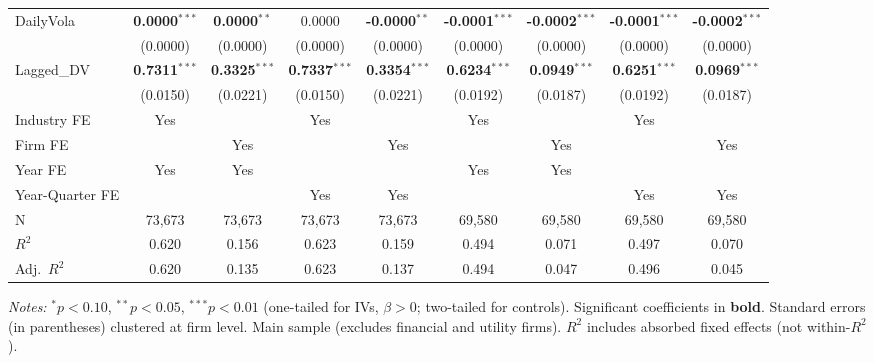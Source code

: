 \documentclass[11pt,a4paper]{article}
\begin{document}
\begin{table}[htbp]
\begin{tabular}{lcccccccc}
DailyVola & \textbf{0.0000}$^{***}$ & \textbf{0.0000}$^{**}$ & 0.0000 & \textbf{-0.0000}$^{**}$ & \textbf{-0.0001}$^{***}$ & \textbf{-0.0002}$^{***}$ & \textbf{-0.0001}$^{***}$ & \textbf{-0.0002}$^{***}$ \\
 & (0.0000) & (0.0000) & (0.0000) & (0.0000) & (0.0000) & (0.0000) & (0.0000) & (0.0000) \\
Lagged\_DV & \textbf{0.7311}$^{***}$ & \textbf{0.3325}$^{***}$ & \textbf{0.7337}$^{***}$ & \textbf{0.3354}$^{***}$ & \textbf{0.6234}$^{***}$ & \textbf{0.0949}$^{***}$ & \textbf{0.6251}$^{***}$ & \textbf{0.0969}$^{***}$ \\
 & (0.0150) & (0.0221) & (0.0150) & (0.0221) & (0.0192) & (0.0187) & (0.0192) & (0.0187) \\
\midrule
Industry FE & Yes &  & Yes &  & Yes &  & Yes &  \\
Firm FE &  & Yes &  & Yes &  & Yes &  & Yes \\
Year FE & Yes & Yes &  &  & Yes & Yes &  &  \\
Year-Quarter FE &  &  & Yes & Yes &  &  & Yes & Yes \\
\midrule
N & 73,673 & 73,673 & 73,673 & 73,673 & 69,580 & 69,580 & 69,580 & 69,580 \\
$R^2$ & 0.620 & 0.156 & 0.623 & 0.159 & 0.494 & 0.071 & 0.497 & 0.070 \\
Adj.~$R^2$ & 0.620 & 0.135 & 0.623 & 0.137 & 0.494 & 0.047 & 0.496 & 0.045 \\
\bottomrule
\end{tabular}
\begin{minipage}{\linewidth}
\vspace{2pt}\scriptsize
\textit{Notes:} $^{*}p<0.10$, $^{**}p<0.05$, $^{***}p<0.01$ (one-tailed for IVs, $\beta > 0$; two-tailed for controls).
 Significant coefficients in \textbf{bold}.
 Standard errors (in parentheses) clustered at firm level.
 Main sample (excludes financial and utility firms).
 $R^2$ includes absorbed fixed effects (not within-$R^2$).
\end{minipage}
\end{table}
\clearpage
\end{document}
